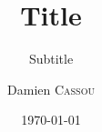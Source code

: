 \documentclass{beamer}
\title{Title}
\subtitle{Subtitle}
\author{Damien \textsc{Cassou}}
\institute
{
Phoenix
}
\date
{\today{}}
\begin{document}
\begin{frame}[plain] %
  \titlepage
\end{frame}
\end{document}
